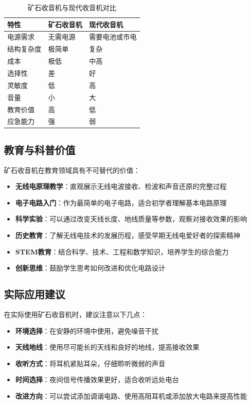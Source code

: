 \documentclass[12pt,UTF8]{ctexbook}
\begin{document}
\begin{table}[htbp]
\centering
\begin{tabular}{|l|l|l|}
\hline
特性 & 矿石收音机 & 现代收音机 \\
\hline
电源需求 & 无需电源 & 需要电池或市电 \\
\hline
结构复杂度 & 极简单 & 复杂 \\
\hline
成本 & 极低 & 中高 \\
\hline
选择性 & 差 & 好 \\
\hline
灵敏度 & 低 & 高 \\
\hline
音量 & 小 & 大 \\
\hline
教育价值 & 高 & 低 \\
\hline
应急能力 & 强 & 弱 \\
\hline
\end{tabular}
\caption{矿石收音机与现代收音机对比}
\label{tab:radio_comparison}
\end{table}

\subsection{教育与科普价值}

矿石收音机在教育领域具有不可替代的价值：

\begin{itemize}
  \item \textbf{无线电原理教学}：直观展示无线电波接收、检波和声音还原的完整过程
  \item \textbf{电子电路入门}：作为最简单的电子电路，适合初学者理解基本电路原理
  \item \textbf{科学实验}：可以通过改变天线长度、地线质量等参数，观察对接收效果的影响
  \item \textbf{历史教育}：了解无线电技术的发展历程，感受早期无线电爱好者的探索精神
  \item \textbf{STEM教育}：结合科学、技术、工程和数学知识，培养学生的综合能力
  \item \textbf{创新思维}：鼓励学生思考如何改进和优化电路设计
\end{itemize}

\subsection{实际应用建议}

在实际使用矿石收音机时，建议注意以下几点：

\begin{itemize}
  \item \textbf{环境选择}：在安静的环境中使用，避免噪音干扰
  \item \textbf{天线地线}：使用尽可能长的天线和良好的地线，提高接收效果
  \item \textbf{收听方式}：将耳机紧贴耳朵，仔细聆听微弱的声音
  \item \textbf{时间选择}：夜间信号传播效果更好，适合收听远处电台
  \item \textbf{改进方向}：可以尝试添加调谐电路、使用高阻耳机或添加放大电路来提高性能
\end{itemize}
\end{document}
